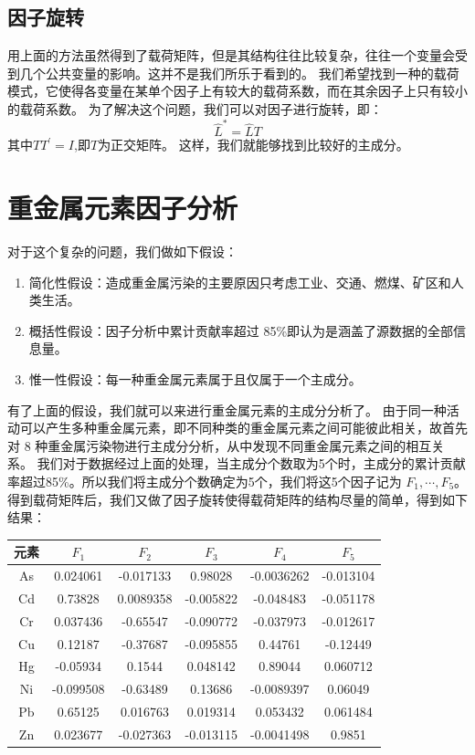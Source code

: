 \documentclass[a4paper]{article}
\begin{document}
\subsection{因子旋转}
用上面的方法虽然得到了载荷矩阵，但是其结构往往比较复杂，往往一个变量会受到几个公共变量的影响。这并不是我们所乐于看到的。
我们希望找到一种的载荷模式，它使得各变量在某单个因子上有较大的载荷系数，而在其余因子上只有较小的载荷系数。
为了解决这个问题，我们可以对因子进行旋转，即：
\begin{equation}
\hat L^* = \hat LT
\end{equation}
其中$TT^{\prime}=I$,即$T$为正交矩阵。
这样，我们就能够找到比较好的主成分。
\section{重金属元素因子分析}
对于这个复杂的问题，我们做如下假设：
\begin{enumerate}
\item 简化性假设：造成重金属污染的主要原因只考虑工业、交通、燃煤、矿区和人类生活。
\item 概括性假设：因子分析中累计贡献率超过 85\%即认为是涵盖了源数据的全部信息量。
\item 惟一性假设：每一种重金属元素属于且仅属于一个主成分。
\end{enumerate} 
\indent 有了上面的假设，我们就可以来进行重金属元素的主成分分析了。
由于同一种活动可以产生多种重金属元素，即不同种类的重金属元素之间可能彼此相关，故首先对 8 种重金属污染物进行主成分分析，从中发现不同重金属元素之间的相互关系。
我们对于数据经过上面的处理，当主成分个数取为5个时，主成分的累计贡献率超过85\%。所以我们将主成分个数确定为5个，我们将这5个因子记为 $F_1,\cdots,F_5$。
得到载荷矩阵后，我们又做了因子旋转使得载荷矩阵的结构尽量的简单，得到如下结果：
\begin{table}[H]
		\centering
		\label{average-contend}
		\begin{tabular}{c|ccccc}
		    \hline                                 
			元素	  &   $F_1$   &  $F_2$  &   $F_3$  &   $F_4$  &  $F_5$   \\
			\hline
			 As   &  0.024061 &   -0.017133  &    0.98028  &  -0.0036262  &  -0.013104    \\
    			 Cd   &   0.73828 &   0.0089358  &  -0.005822  &   -0.048483  &  -0.051178    \\  
    			 Cr   &  0.037436 &    -0.65547  &  -0.090772  &   -0.037973  &  -0.012617    \\
    			 Cu   &   0.12187 &    -0.37687  &  -0.095855  &     0.44761  &   -0.12449    \\
   			 Hg   &  -0.05934 &      0.1544  &   0.048142  &     0.89044  &   0.060712    \\
   			 Ni   & -0.099508 &    -0.63489  &    0.13686  &  -0.0089397  &    0.06049    \\
   			 Pb   &   0.65125 &    0.016763  &   0.019314  &    0.053432  &   0.061484    \\
   			 Zn   &  0.023677 &   -0.027363  &  -0.013115  &  -0.0041498  &     0.9851    \\
   			 \hline
		\end{tabular}
\end{table}
\end{document}
